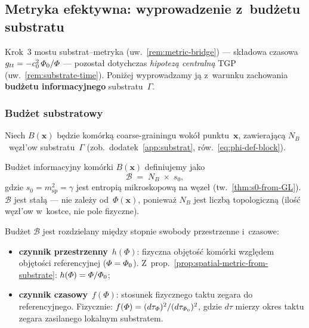 \subsection{Metryka efektywna: wyprowadzenie z~bud\.zetu substratu}%
\label{ssec:metric-from-budget}

Krok~3 mostu substrat--metryka
(uw.~\ref{rem:metric-bridge}) --- sk\l{}adowa czasowa
$g_{tt} = -c_0^2\,\varPhi_0/\varPhi$ --- pozosta\l{} dotychczas
\emph{hipotez\k{a} centraln\k{a}} TGP
(uw.~\ref{rem:substrate-time}).
Poni\.zej wyprowadzamy j\k{a} z~warunku zachowania
\textbf{bud\.zetu informacyjnego} substratu~$\Gamma$.

\subsubsection{Bud\.zet substratowy}%
\label{sssec:substrate-budget}

Niech $B(\mathbf{x})$ b\k{e}dzie kom\'ork\k{a} coarse-grainingu
wok\'o\l{} punktu~$\mathbf{x}$, zawieraj\k{a}c\k{a} $N_B$~w\k{e}z\l{}'ow
substratu~$\Gamma$ (zob.\ dodatek~\ref{app:substrat},
r\'ow.~\eqref{eq:phi-def-block}).

\begin{definition}%
\label{def:info-budget}
Bud\.zet informacyjny kom\'orki $B(\mathbf{x})$ definiujemy jako
\begin{equation}\label{eq:budget-def}
  \mathcal{B} \;=\;
  N_B \;\times\; s_0,
\end{equation}
gdzie $s_0 = m_{\mathrm{sp}}^2 = \gamma$ jest entropi\k{a}
mikroskopow\k{a} na w\k{e}ze\l{} (tw.~\ref{thm:s0-from-GL}).
$\mathcal{B}$ jest sta\l{}\k{a} --- nie zale\.zy od~$\Phi(\mathbf{x})$,
poniewa\.z $N_B$ jest liczb\k{a} topologiczn\k{a}
(ilo\'s\'c w\k{e}z\l{}'ow w~kostce, nie pole fizyczne).
\end{definition}

Bud\.zet $\mathcal{B}$ jest rozdzielany mi\k{e}dzy stopnie swobody
przestrzenne i~czasowe:
\begin{itemize}[nosep]
  \item \textbf{czynnik przestrzenny}~$h(\Phi)$:
        fizyczna obj\k{e}to\'s\'c kom\'orki wzgl\k{e}dem
        obj\k{e}to\'sci referencyjnej ($\varPhi = \varPhi_0$).
        Z~prop.~\ref{prop:spatial-metric-from-substrate}:
        $h(\varPhi) = \varPhi/\varPhi_0$;
  \item \textbf{czynnik czasowy}~$f(\Phi)$:
        stosunek fizycznego taktu zegara do referencyjnego.
        Fizycznie: $f(\varPhi) = (d\tau_{\varPhi})^2 / (d\tau_{\varPhi_0})^2$,
        gdzie $d\tau$ mierzy okres taktu zegara zasilanego
        lokalnym substratem.
\end{itemize}

